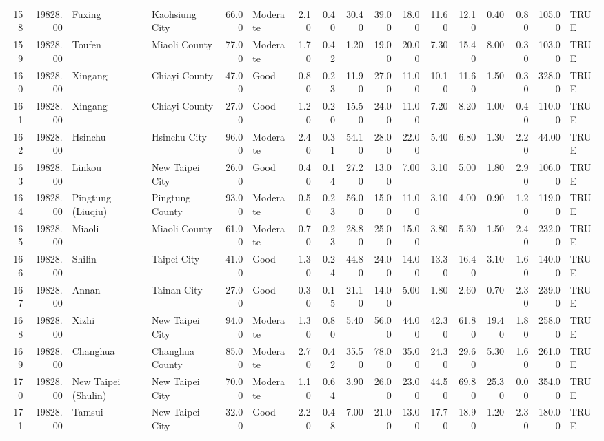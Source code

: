 \begin{table}[ht]
\begin{tabular}{rrllrlrrrrrrrrrrl}
  158 & 19828.00 & Fuxing & Kaohsiung City & 66.00 & Moderate & 2.10 & 0.40 & 30.40 & 39.00 & 18.00 & 11.60 & 12.10 & 0.40 & 0.80 & 105.00 & TRUE \\ 
  159 & 19828.00 & Toufen & Miaoli County & 77.00 & Moderate & 1.70 & 0.42 & 1.20 & 19.00 & 20.00 & 7.30 & 15.40 & 8.00 & 0.30 & 103.00 & TRUE \\ 
  160 & 19828.00 & Xingang & Chiayi County & 47.00 & Good & 0.80 & 0.23 & 11.90 & 27.00 & 11.00 & 10.10 & 11.60 & 1.50 & 0.30 & 328.00 & TRUE \\ 
  161 & 19828.00 & Xingang & Chiayi County & 27.00 & Good & 1.20 & 0.20 & 15.50 & 24.00 & 11.00 & 7.20 & 8.20 & 1.00 & 0.40 & 110.00 & TRUE \\ 
  162 & 19828.00 & Hsinchu & Hsinchu City & 96.00 & Moderate & 2.40 & 0.31 & 54.10 & 28.00 & 22.00 & 5.40 & 6.80 & 1.30 & 2.20 & 44.00 & TRUE \\ 
  163 & 19828.00 & Linkou & New Taipei City & 26.00 & Good & 0.40 & 0.14 & 27.20 & 13.00 & 7.00 & 3.10 & 5.00 & 1.80 & 2.90 & 106.00 & TRUE \\ 
  164 & 19828.00 & Pingtung (Liuqiu) & Pingtung County & 93.00 & Moderate & 0.50 & 0.23 & 56.00 & 15.00 & 11.00 & 3.10 & 4.00 & 0.90 & 1.20 & 119.00 & TRUE \\ 
  165 & 19828.00 & Miaoli & Miaoli County & 61.00 & Moderate & 0.70 & 0.23 & 28.80 & 25.00 & 15.00 & 3.80 & 5.30 & 1.50 & 2.40 & 232.00 & TRUE \\ 
  166 & 19828.00 & Shilin & Taipei City & 41.00 & Good & 1.30 & 0.24 & 44.80 & 24.00 & 14.00 & 13.30 & 16.40 & 3.10 & 1.60 & 140.00 & TRUE \\ 
  167 & 19828.00 & Annan & Tainan City & 27.00 & Good & 0.30 & 0.15 & 21.10 & 14.00 & 5.00 & 1.80 & 2.60 & 0.70 & 2.30 & 239.00 & TRUE \\ 
  168 & 19828.00 & Xizhi & New Taipei City & 94.00 & Moderate & 1.30 & 0.80 & 5.40 & 56.00 & 44.00 & 42.30 & 61.80 & 19.40 & 1.80 & 258.00 & TRUE \\ 
  169 & 19828.00 & Changhua & Changhua County & 85.00 & Moderate & 2.70 & 0.42 & 35.50 & 78.00 & 35.00 & 24.30 & 29.60 & 5.30 & 1.60 & 261.00 & TRUE \\ 
  170 & 19828.00 & New Taipei (Shulin) & New Taipei City & 70.00 & Moderate & 1.10 & 0.64 & 3.90 & 26.00 & 23.00 & 44.50 & 69.80 & 25.30 & 0.00 & 354.00 & TRUE \\ 
  171 & 19828.00 & Tamsui & New Taipei City & 32.00 & Good & 2.20 & 0.48 & 7.00 & 21.00 & 13.00 & 17.70 & 18.90 & 1.20 & 2.30 & 180.00 & TRUE \\ 

\end{tabular}
\end{table}

